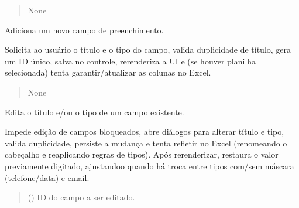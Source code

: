 \documentclass[letterpaper,10pt,english]{sphinxmanual}
\begin{document}
\begin{fulllineitems}
\begin{fulllineitems}
\begin{quote}
\begin{description}
\sphinxAtStartPar
None

\end{description}\end{quote}

\end{fulllineitems}


\begin{fulllineitems}
\label{\detokenize{api/app:app.App.add_field}}
\pysigstartsignatures
\pysiglinewithargsret
{}
{}
{}
\pysigstopsignatures
\sphinxAtStartPar
Adiciona um novo campo de preenchimento.

\sphinxAtStartPar
Solicita ao usuário o título e o tipo do campo, valida duplicidade de título,
gera um ID único, salva no controle, re\sphinxhyphen{}renderiza a UI e (se houver planilha
selecionada) tenta garantir/atualizar as colunas no Excel.
\begin{quote}\begin{description}
\sphinxAtStartPar
{}

\sphinxAtStartPar
None

\end{description}\end{quote}

\end{fulllineitems}


\begin{fulllineitems}
\label{\detokenize{api/app:app.App.edit_field}}
\pysigstartsignatures
\pysiglinewithargsret
{}
{}
{}
\pysigstopsignatures
\sphinxAtStartPar
Edita o título e/ou o tipo de um campo existente.

\sphinxAtStartPar
Impede edição de campos bloqueados, abre diálogos para alterar título e tipo,
valida duplicidade, persiste a mudança e tenta refletir no Excel (renomeando
o cabeçalho e reaplicando regras de tipos). Após re\sphinxhyphen{}renderizar, restaura o
valor previamente digitado, ajustando\sphinxhyphen{}o quando há troca entre tipos com/sem
máscara (telefone/data) e e\sphinxhyphen{}mail.
\begin{quote}\begin{description}
\sphinxAtStartPar
{} () \textendash{} ID do campo a ser editado.


\end{description}
\end{quote}
\end{fulllineitems}
\end{fulllineitems}
\end{document}
